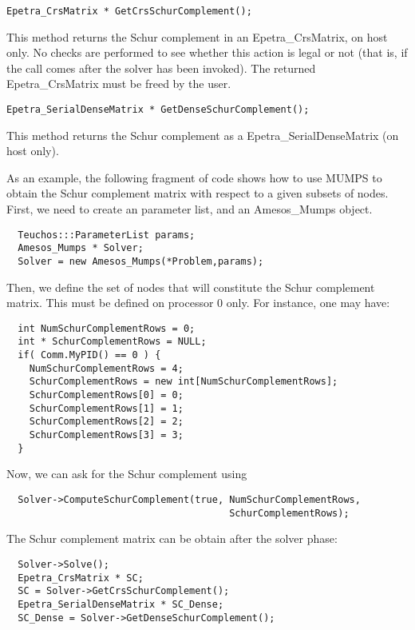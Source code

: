 \documentclass[11pt]{SANDreport}
\begin{document}
\medskip

\begin{verbatim}
Epetra_CrsMatrix * GetCrsSchurComplement();
\end{verbatim}
This method returns the Schur complement in an Epetra\_CrsMatrix, on host
only. No checks are performed to see whether this action is legal or not
(that is, if the call comes after the solver has been invoked).
The returned Epetra\_CrsMatrix must be freed by the user.

\medskip

\begin{verbatim}
Epetra_SerialDenseMatrix * GetDenseSchurComplement();
\end{verbatim}
This method returns the Schur complement as a Epetra\_SerialDenseMatrix
(on host only).

\medskip


As an example, the following fragment of code shows how to use MUMPS to
obtain the Schur complement matrix with respect to a given subsets of
nodes.  First, we need to create an parameter list, and an Amesos\_Mumps
object.
\begin{verbatim}
  Teuchos:::ParameterList params;
  Amesos_Mumps * Solver;
  Solver = new Amesos_Mumps(*Problem,params);
\end{verbatim}
Then, we define the set of nodes that will constitute the Schur
complement matrix. This must be defined on processor 0 only. For
instance, one may have:
\begin{verbatim}
  int NumSchurComplementRows = 0;
  int * SchurComplementRows = NULL;
  if( Comm.MyPID() == 0 ) {
    NumSchurComplementRows = 4;
    SchurComplementRows = new int[NumSchurComplementRows];
    SchurComplementRows[0] = 0;
    SchurComplementRows[1] = 1; 
    SchurComplementRows[2] = 2;
    SchurComplementRows[3] = 3;
  }
\end{verbatim}
Now, we can ask for the Schur complement using
\begin{verbatim}  
  Solver->ComputeSchurComplement(true, NumSchurComplementRows,
                                       SchurComplementRows);
\end{verbatim}
The Schur complement matrix can be obtain after the solver phase:  
\begin{verbatim}  
  Solver->Solve();
  Epetra_CrsMatrix * SC;
  SC = Solver->GetCrsSchurComplement();
  Epetra_SerialDenseMatrix * SC_Dense;
  SC_Dense = Solver->GetDenseSchurComplement();
\end{verbatim}
\end{document}
